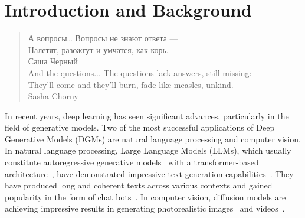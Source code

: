 \chapter{Introduction and Background}\label{chap:intro}

\begin{quote}
\normalsize\itshape
\begin{flushright}
\foreignlanguage{russian}{А вопросы… Вопросы не знают ответа —}\\
\foreignlanguage{russian}{Налетят, разожгут и умчатся, как корь.} \\
\foreignlanguage{russian}{Саша Черный} \\ \vskip 10pt
 And the questions...  The questions lack answers, still missing:\\
 They'll come and they'll burn, fade like measles, unkind.\\
 Sasha Chorny
\end{flushright}
\end{quote}


In recent years, deep learning has seen significant advances, particularly in the field of generative models. Two of the most successful applications of Deep Generative Models (DGMs) are natural language processing and computer vision. In natural language processing, Large Language Models (LLMs), which usually constitute autoregressive generative models~\citep{graves2013generating} with a transformer-based architecture~\citep{vaswani2017attention}, have demonstrated impressive text generation capabilities~\citep{brown2020language,chowdhery2023palm}. They have produced long and coherent texts across various contexts and gained popularity in the form of chat bots~\citep{achiam2023gpt}. In computer vision, diffusion models are achieving impressive results in generating photorealistic images~\citep{dhariwal2021diffusion} and videos~\citep{ho2022video}.

